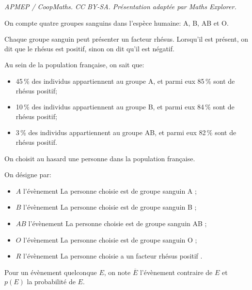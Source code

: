 \documentclass[10pt]{article}
\begin{document}
\noindent\textit{APMEP / CoopMaths. CC BY-SA. Présentation adaptée par Maths Explorer.}\par\medskip
\medskip

On compte quatre groupes sanguins dans l'espèce humaine: A, B, AB et O.

Chaque groupe sanguin peut présenter un facteur rhésus. Lorsqu'il est présent, on dit que le rhésus est positif, sinon on dit qu'il est négatif.

Au sein de la population française, on sait que:


\begin{itemize}[label=$\bullet~$]
\item 45\,\% des individus appartiennent au groupe A, et parmi eux 85\,\% sont de rhésus positif;
\item 10\,\% des individus appartiennent au groupe B, et parmi eux 84\,\% sont de rhésus positif;
\item 3\,\% des individus appartiennent au groupe AB, et parmi eux 82\,\% sont de rhésus positif.
\end{itemize}
\smallskip

On choisit au hasard une personne dans la population française. 

On désigne par:

\begin{itemize}[label=$\bullet~$]
\item $A$ l'évènement \og La personne choisie est de groupe sanguin A \fg{} ;
\item $B$ l'évènement \og La personne choisie est de groupe sanguin B \fg ;
\item $AB$ l'évènement \og La personne choisie est de groupe sanguin AB \fg ; 
\item $O$ l'évènement \og La personne choisie est de groupe sanguin O \fg ;
\item $R$ l'évènement \og La personne choisie a un facteur rhésus positif \fg.
\end{itemize}

\medskip

Pour un évènement quelconque $E$, on note $\overline{E}$ l'évènement contraire de $E$ et $p(E)$ la probabilité de $E$.

\medskip
\end{document}
